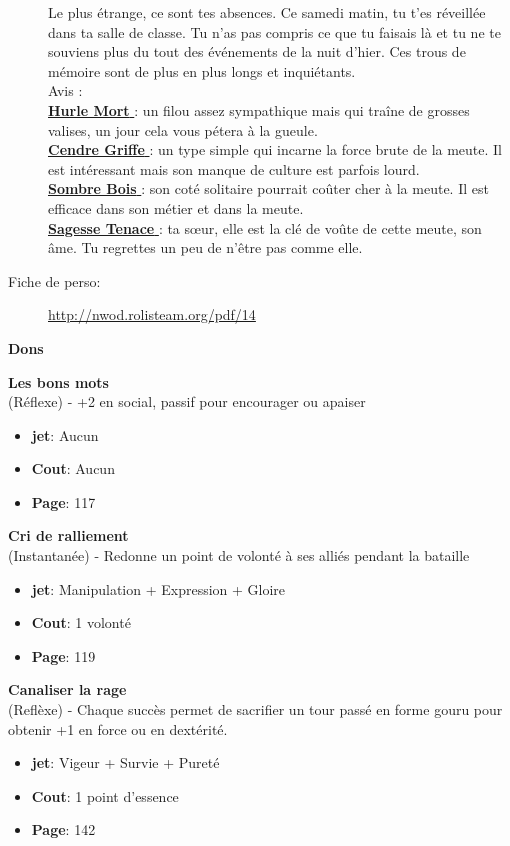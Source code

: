 \documentclass[oneside,12pt]{book}
\newcommand\don[6]{
\textbf{#1} \\
(#6) - #2
\begin{itemize}
\item{ \textbf{jet}: #3}
\item{ \textbf{Cout}: #4}
\item{ \textbf{Page}: #5}
\end{itemize}
\vspace{0.5cm}
}
\newcommand{\Jessica}{\textbf{Sagesse Tenace} }
\newcommand{\Luke}{\textbf{Cendre Griffe} }
\newcommand{\Peter}{\textbf{Hurle Mort} }
\newcommand{\Leonard}{\textbf{Sombre Bois} }
\begin{document}
\begin{flushleft}
\begin{description}
{Le plus étrange, ce sont tes absences. Ce samedi matin, tu t'es réveillée dans ta salle de classe. Tu n'as pas compris ce que tu faisais là et tu ne te souviens plus du tout des événements de la nuit d'hier. Ces trous de mémoire sont de plus en plus longs et inquiétants. \\
Avis :\\
\underline{\Peter} : un filou assez sympathique mais qui traîne de grosses valises, un jour cela vous pétera à la gueule.\\
\underline{\Luke} : un type simple qui incarne la force brute de la meute. Il est intéressant mais son manque de culture est parfois lourd.\\
\underline{\Leonard} : son coté solitaire pourrait coûter cher à la meute. Il est efficace dans son métier et dans la meute.\\
\underline{\Jessica}: ta sœur, elle est la clé de voûte de cette meute, son âme. Tu regrettes un peu de n'être pas comme elle.\\
}
\item[Fiche de perso:]{\href{http://nwod.rolisteam.org/pdf/14}{http://nwod.rolisteam.org/pdf/14}}
\end{description}

\clearpage
\textbf{\large Dons} 
\vspace{0.5cm}

\don{Les bons mots}{+2 en social, passif pour encourager ou apaiser}{Aucun}{Aucun}{117}{Réflexe}
\don{Cri de ralliement}{Redonne un point de volonté à ses alliés pendant la bataille}{Manipulation + Expression + Gloire}{1 volonté}{119}{Instantanée}
\don{Canaliser la rage}{Chaque succès permet de sacrifier un tour passé en forme gouru pour obtenir +1 en force ou en dextérité.}{Vigeur + Survie + Pureté}{1 point d'essence}{142}{Reflèxe}

\clearpage

\end{flushleft}
\end{document}
